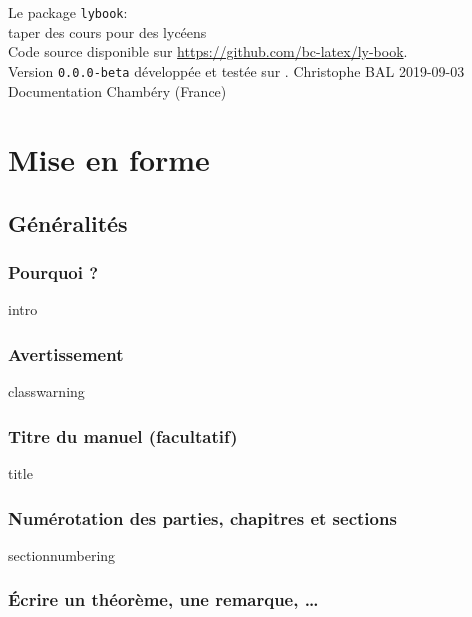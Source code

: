 \documentclass[12pt]{memoir}
\begin{document}
\buildfront
	{
		Le package \texttt{lybook}:
		\\
		taper des cours pour des lycéens
		\\
		{
			\footnotesize Code source disponible sur 
			\url{https://github.com/bc-latex/ly-book}.
		}
		\\
		{
			\footnotesize Version \texttt{0.0.0-beta} développée 
			et testée sur \macosxname{}.
		}
	}
	{Christophe BAL}
	{2019-09-03}
	{Documentation}
	{Chambéry (France)}



\part{Mise en forme}

\chapter{Généralités}

\section{Pourquoi ?}

{intro}




\section{Avertissement}

{classwarning}




\section{Titre du manuel (facultatif)}

{title}




\section{Numérotation des parties, chapitres et sections}

{sectionnumbering}




\section{Écrire un théorème, une remarque, \dots}
\end{document}
